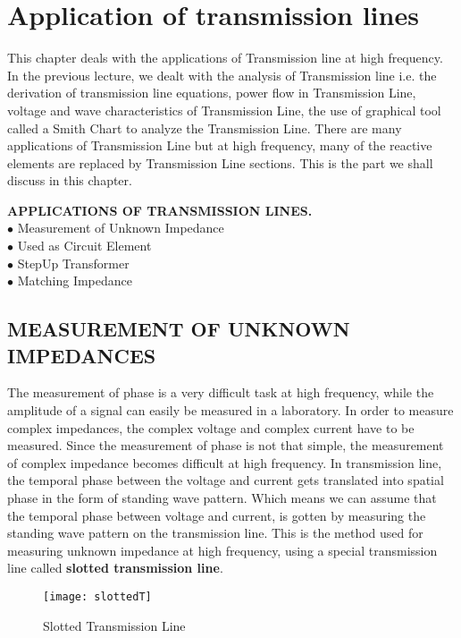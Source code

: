 \chapter{Application of transmission lines}
This chapter deals with the applications of Transmission line at high frequency. In the previous lecture, we dealt with the
analysis of Transmission line i.e. the derivation of transmission line equations, power flow in Transmission Line, voltage and wave characteristics of Transmission Line, the use of graphical tool called a Smith Chart to analyze the Transmission Line.
There are many applications of Transmission Line but at high frequency, many of the reactive elements are replaced by Transmission Line sections. This is the part we shall discuss in this chapter.

\textbf{APPLICATIONS OF TRANSMISSION LINES.}\\
$ \bullet $ Measurement of Unknown Impedance \\
$ \bullet $ Used as Circuit Element \\
$ \bullet $ StepUp Transformer  \\
$ \bullet $ Matching Impedance\newline
\section{{\normalsize MEASUREMENT OF UNKNOWN IMPEDANCES}}

The measurement of phase is a very difficult task at high frequency, while the amplitude of a signal can easily be measured
in a laboratory. In order to measure complex impedances, the
complex voltage and complex current have to be measured. Since the measurement of phase is not that simple, the measurement of
complex impedance becomes difficult at high frequency.
In transmission line, the temporal phase between the voltage and
current gets translated into spatial phase in the form of standing wave pattern.\newline 
Which means we can assume that the
temporal phase between voltage and current, is gotten by measuring the standing wave pattern on the transmission line.
This is the method used for measuring unknown impedance at high frequency, using a special transmission line called \textbf{slotted
	transmission line}.
\begin{figure}[h]
	\centering
	\texttt{[image: slottedT]}
	\caption{Slotted Transmission Line}
\end{figure}

